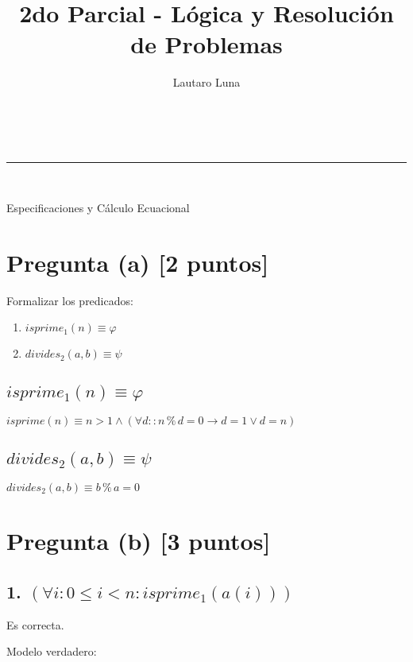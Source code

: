 \documentclass[a4paper,11pt]{article}
\makeatletter
\newcommand{\linia}{\rule{\linewidth}{0.5pt}}
\renewcommand{\maketitle}{
\begin{center}
\vspace{2ex}
{\Large \textsc{\@title}}
\vspace{1ex}
\\
\linia\\
\@author \hfill \@date
\vspace{4ex}
\end{center}
}
\makeatother
\begin{document}
\title{2do Parcial - Lógica y Resolución de Problemas}

\author{Lautaro Luna}

\date{}

\maketitle

\vspace*{-1cm}

Especificaciones y Cálculo Ecuacional

\section{Pregunta (a) [2 puntos]}

Formalizar los predicados:
\begin{enumerate}
	\item $isprime_1(n) \equiv \varphi$
	\item $divides_2(a, b) \equiv \psi$
\end{enumerate}

\subsection{$isprime_1(n) \equiv \varphi$}

$isprime(n) \equiv n > 1 \land (\forall d :: n \mathbin{\%} d = 0 \rightarrow d = 1 \lor d = n)$

\subsection{$divides_2(a, b) \equiv \psi$}

$divides_2(a, b) \equiv b \mathbin{\%} a = 0$

\section{Pregunta (b) [3 puntos]}

\subsection{1. $(\forall i : 0 \leq i < n : isprime_1(a(i)))$}

Es correcta.

Modelo verdadero:
\end{document}
